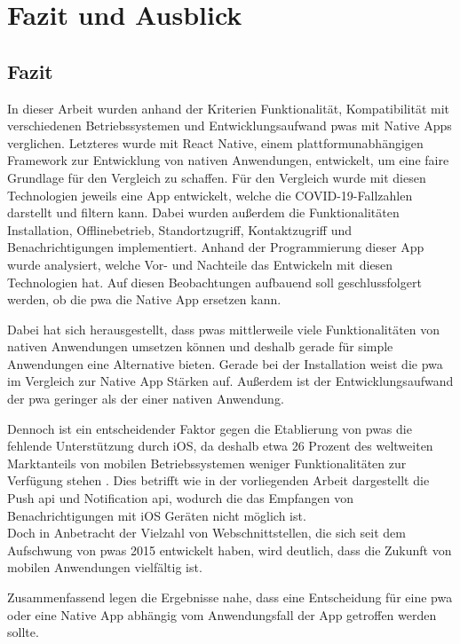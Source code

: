 \chapter{Fazit und Ausblick}\label{ch:summary}
\section{Fazit}
In dieser Arbeit wurden anhand der Kriterien Funktionalität, Kompatibilität mit verschiedenen Betriebssystemen und Entwicklungsaufwand \acp{pwa} mit Native Apps verglichen.
Letzteres wurde mit React Native, einem plattformunabhängigen Framework zur Entwicklung von nativen Anwendungen, entwickelt, um eine faire Grundlage für den Vergleich zu schaffen.
Für den Vergleich wurde mit diesen Technologien jeweils eine App entwickelt, welche die COVID-19-Fallzahlen darstellt und filtern kann.
Dabei wurden außerdem die Funktionalitäten Installation, Offlinebetrieb, Standortzugriff, Kontaktzugriff und Benachrichtigungen implementiert.
Anhand der Programmierung dieser App wurde analysiert, welche Vor- und Nachteile das Entwickeln mit diesen Technologien hat.
Auf diesen Beobachtungen aufbauend soll geschlussfolgert werden, ob die \ac{pwa} die Native App ersetzen kann.

Dabei hat sich herausgestellt, dass \acp{pwa} mittlerweile viele Funktionalitäten von nativen Anwendungen umsetzen können und deshalb gerade für simple Anwendungen eine Alternative bieten.
Gerade bei der Installation weist die \ac{pwa} im Vergleich zur Native App Stärken auf.
Außerdem ist der Entwicklungsaufwand der \ac{pwa} geringer als der einer nativen Anwendung.

Dennoch ist ein entscheidender Faktor gegen die Etablierung von \acp{pwa} die fehlende Unterstützung durch iOS, da deshalb etwa 26 Prozent des weltweiten Marktanteils von mobilen Betriebssystemen weniger Funktionalitäten zur Verfügung stehen \cite{ODea.2021}.
Dies betrifft wie in der vorliegenden Arbeit dargestellt die Push \ac{api} und Notification \ac{api}, wodurch die das Empfangen von Benachrichtigungen mit iOS Geräten nicht möglich ist.\\
Doch in Anbetracht der Vielzahl von Webschnittstellen, die sich seit dem Aufschwung von \acp{pwa} 2015 entwickelt haben, wird deutlich, dass die Zukunft von mobilen Anwendungen vielfältig ist.

Zusammenfassend legen die Ergebnisse nahe, dass eine Entscheidung für eine \ac{pwa} oder eine Native App abhängig vom Anwendungsfall der App getroffen werden sollte.


